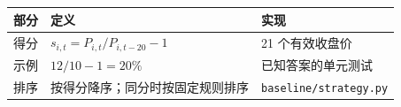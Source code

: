 \begin{tabular}{@{}P{3.1cm}P{4.5cm}P{4.9cm}@{}}
\toprule
\textbf{部分} & \textbf{定义} & \textbf{实现} \\
\midrule
得分 & $s_{i,t}=P_{i,t}/P_{i,t-20}-1$ & 21 个有效收盘价 \\
示例 & $12/10-1=20\%$ & 已知答案的单元测试 \\
排序 & 按得分降序；\newline 同分时按固定规则排序 & \texttt{baseline/strategy.py} \\
\bottomrule
\end{tabular}
